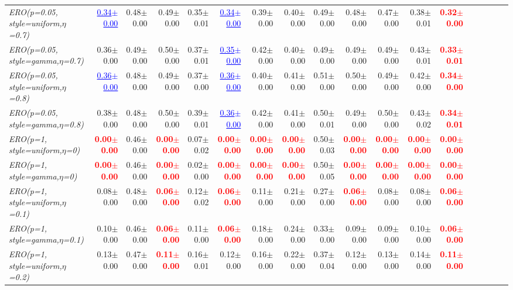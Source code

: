 \documentclass[nohyperref]{article}
\theoremstyle{plain}
\theoremstyle{definition}
\theoremstyle{remark}
\newcommand{\red}[1]{\textcolor{red}{\textbf{#1}}}
\newcommand{\blue}[1]{\textcolor{blue}{\underline{#1}}}
\begin{document}
\begin{table*}[!ht]
{\begin{tabular}{lrrrrrrrrrrrrrrrrr}
			{\it ERO(p=0.05, style=uniform,$\eta$=0.7)} & \blue{0.34$\pm$0.00} & 0.48$\pm$0.00 & 0.49$\pm$0.00 & 0.35$\pm$0.01 & \blue{0.34$\pm$0.00} & 0.39$\pm$0.00 & 0.40$\pm$0.00 & 0.49$\pm$0.00 & 0.48$\pm$0.00 & 0.47$\pm$0.00  & 0.38$\pm$0.01 & \red{0.32$\pm$0.00} \\
			{\it ERO(p=0.05, style=gamma,$\eta$=0.7)} & 0.36$\pm$0.00 & 0.49$\pm$0.00 & 0.50$\pm$0.00 & 0.37$\pm$0.01 & \blue{0.35$\pm$0.00} & 0.42$\pm$0.00 & 0.40$\pm$0.00 & 0.49$\pm$0.00 & 0.49$\pm$0.00 & 0.49$\pm$0.00  & 0.43$\pm$0.01 & \red{0.33$\pm$0.01} \\
			{\it ERO(p=0.05, style=uniform,$\eta$=0.8)} & \blue{0.36$\pm$0.00} & 0.48$\pm$0.00 & 0.49$\pm$0.00 & 0.37$\pm$0.00 & \blue{0.36$\pm$0.00} & 0.40$\pm$0.00 & 0.41$\pm$0.00 & 0.51$\pm$0.00 & 0.50$\pm$0.00 & 0.49$\pm$0.00  & 0.42$\pm$0.00 & \red{0.34$\pm$0.00} \\
			{\it ERO(p=0.05, style=gamma,$\eta$=0.8)} & 0.38$\pm$0.00 & 0.48$\pm$0.00 & 0.50$\pm$0.00 & 0.39$\pm$0.01 & \blue{0.36$\pm$0.00} & 0.42$\pm$0.00 & 0.41$\pm$0.00 & 0.50$\pm$0.01 & 0.49$\pm$0.00 & 0.50$\pm$0.00  & 0.43$\pm$0.02 & \red{0.34$\pm$0.01} \\
			{\it ERO(p=1, style=uniform,$\eta$=0)} & \red{0.00$\pm$0.00} & 0.46$\pm$0.00 & \red{0.00$\pm$0.00} & 0.07$\pm$0.02 & \red{0.00$\pm$0.00} & \red{0.00$\pm$0.00} & \red{0.00$\pm$0.00} & 0.50$\pm$0.03 & \red{0.00$\pm$0.00} & \red{0.00$\pm$0.00}  & \red{0.00$\pm$0.00} & \red{0.00$\pm$0.00} \\
			{\it ERO(p=1, style=gamma,$\eta$=0)} & \red{0.00$\pm$0.00} & 0.46$\pm$0.00 & \red{0.00$\pm$0.00} & 0.02$\pm$0.00 & \red{0.00$\pm$0.00} & \red{0.00$\pm$0.00} & \red{0.00$\pm$0.00} & 0.50$\pm$0.05 & \red{0.00$\pm$0.00} & \red{0.00$\pm$0.00}  & \red{0.00$\pm$0.00} & \red{0.00$\pm$0.00} \\
			{\it ERO(p=1, style=uniform,$\eta$=0.1)} & 0.08$\pm$0.00 & 0.48$\pm$0.00 & \red{0.06$\pm$0.00} & 0.12$\pm$0.02 & \red{0.06$\pm$0.00} & 0.11$\pm$0.00 & 0.21$\pm$0.00 & 0.27$\pm$0.00 & \red{0.06$\pm$0.00} & 0.08$\pm$0.00  & 0.08$\pm$0.00 & \red{0.06$\pm$0.00} \\
			{\it ERO(p=1, style=gamma,$\eta$=0.1)} & 0.10$\pm$0.00 & 0.46$\pm$0.00 & \red{0.06$\pm$0.00} & 0.11$\pm$0.00 & \red{0.06$\pm$0.00} & 0.18$\pm$0.00 & 0.24$\pm$0.00 & 0.33$\pm$0.00 & 0.09$\pm$0.00 & 0.09$\pm$0.00  & 0.10$\pm$0.00 & \red{0.06$\pm$0.00} \\
			{\it ERO(p=1, style=uniform,$\eta$=0.2)} & 0.13$\pm$0.00 & 0.47$\pm$0.00 & \red{0.11$\pm$0.00} & 0.16$\pm$0.01 & 0.12$\pm$0.00 & 0.16$\pm$0.00 & 0.22$\pm$0.00 & 0.37$\pm$0.04 & 0.12$\pm$0.00 & 0.13$\pm$0.00  & 0.14$\pm$0.00 & \red{0.11$\pm$0.00} \\

\end{tabular}}
\end{table*}
\end{document}
